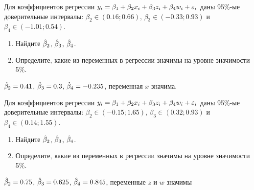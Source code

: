 \begin{problem}
Для коэффициентов регрессии $y_i = \beta_1 + \beta_2 x_i + \beta_3 z_i  + \beta_4 w_i + \varepsilon_i$ даны 95\%-ые
доверительные интервалы: $\beta_2 \in (0.16;0.66)$, $\beta_3 \in (-0.33;0.93)$ и $\beta_4 \in (-1.01; 0.54)$.

\begin{enumerate}
\item Найдите $\hat{\beta}_2$, $\hat{\beta}_3$, $\hat{\beta}_4$.
\item Определите, какие из переменных в регрессии значимы на уровне значимости 5\%.
\end{enumerate}


\begin{sol}
$\hat{\beta}_2=0.41$, $\hat{\beta}_3=0.3$, $\hat{\beta}_4= -0.235$, переменная $x$ значима.
\end{sol}
\end{problem}



\begin{problem}
Для коэффициентов регрессии $y_i = \beta_1 + \beta_2 x_i + \beta_3 z_i  + \beta_4 w_i + \varepsilon_i$ даны 95\%-ые
доверительные интервалы: $\beta_2 \in (-0.15;1.65)$, $\beta_3 \in (0.32;0.93)$ и $\beta_4 \in (0.14; 1.55)$.

\begin{enumerate}
\item Найдите $\hat{\beta}_2$, $\hat{\beta}_3$, $\hat{\beta}_4$.
\item Определите, какие из переменных в регрессии значимы на уровне значимости 5\%.
\end{enumerate}


\begin{sol}
$\hat{\beta}_2=0.75$, $\hat{\beta}_3=0.625$, $\hat{\beta}_4= 0.845$, переменные $z$ и $w$ значимы
\end{sol}
\end{problem}


